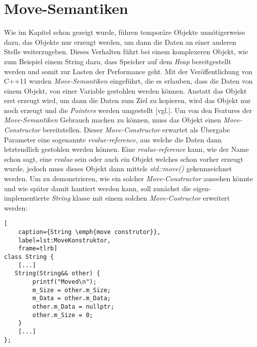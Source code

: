 \section{Move-Semantiken}\label{sec:move}
Wie im Kapitel \emph{} schon gezeigt wurde, führen temporäre Objekte
unnötigerweise
dazu, das Objekte nur erzeugt werden, um dann die Daten an einer anderen Stelle weiterzugeben.
Dieses Verhalten führt bei einem komplexeren Objekt, wie zum Beispiel einem String dazu, dass
Speicher auf dem \emph{Heap} bereitgestellt werden und somit zur Lasten der Performance geht.
\newline
\newline
Mit der Veröffentlichung von C++11 wurden \emph{Move-Semantiken} eingeführt, die es erlauben, dass
die Daten von einem Objekt, von einer Variable gestohlen werden können. Anstatt das Objekt
erst erzeugt wird, um dann die Daten zum Ziel zu kopieren, wird das Objekt nur noch erzeugt und
die \emph{Pointers} werden umgestellt \cite{VisualisingC++}[vgl.]. Um von den Features der
\emph{Move-Semantiken} Gebrauch machen zu können, muss das Objekt einen \emph{Move-Constructor}
bereitstellen. Dieser \emph{Move-Constructor} erwartet als Übergabe Parameter eine sogenannte
\emph{rvalue-reference}, aus welche die Daten dann letztendlich gestohlen werden können. Eine
\emph{rvalue-reference} kann, wie der Name schon sagt, eine \emph{rvalue} sein oder auch ein Objekt
welches schon vorher erzeugt wurde, jedoch muss dieses Objekt dann mittels \emph{std::move()}
gekennzeichnet werden.
\newline
\newline
Um zu demonstrieren, wie ein solcher \emph{Move-Constructor} aussehen könnte und wie später damit
hantiert werden kann, soll zunächst die eigen-implementierte \emph{String} klasse mit einem solchen
\emph{Move-Costructor} erweitert werden:

\begin{lstlisting}[
    caption={String \emph{move construtor}},
    label=lst:MoveKonstruktor,
    frame=tlrb]
class String {
	[...]
   String(String&& other) {
        printf("Moved\n");
        m_Size = other.m_Size;
        m_Data = other.m_Data;
        other.m_Data = nullptr;
        other.m_Size = 0;
    }
	[...]
};
\end{lstlisting}

